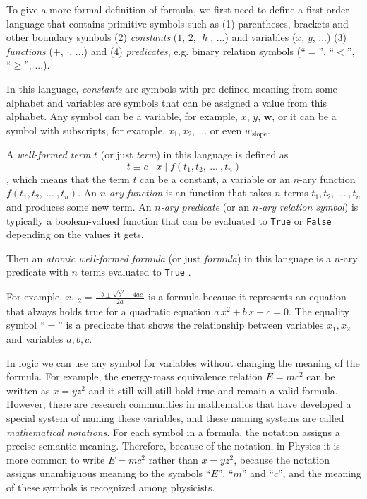 To give a more formal definition of formula, we first need to define 
a first-order language that contains primitive symbols such as
(1) parentheses, brackets and other boundary symbols 
(2) \emph{constants} ($1$, $2$, $\hslash$, ...) and variables ($x$, $y$, ...)
(3) \emph{functions} ($+$, $\cdot$, ...) and
(4) \emph{predicates}, e.g. binary relation symbols (``$=$'', ``$<$'', ``$\geqslant$'', ...). 

In this language, \emph{constants} are symbols with pre-defined meaning 
from some alphabet and variables are symbols that can be assigned 
a value from this alphabet.
Any symbol can be a variable, for example, $x$, $y$, $\mathbf w$, or it can 
be a symbol with subscripts, for example, $x_1, x_2, \ ...$ or even $w_\text{slope}$.

A \emph{well-formed term} $t$ (or just \emph{term}) in this language is defined as 
$$t \equiv c \mid x \mid f(t_1, t_2, \ ... \ , t_n)$$, which means that the term
$t$ can be a constant, a variable or an $n$-ary function 
$f(t_1, t_2, \ ... \ , t_n)$. An  \emph{$n$-ary function} is an 
function that takes $n$ terms $t_1, t_2, \ ... \ , t_n$ and produces 
some new term. An \emph{$n$-ary predicate} (or an \emph{$n$-ary relation symbol})
is typically a boolean-valued function that can be evaluated to \texttt{True} 
or \texttt{False} depending on the values it gets. 

Then an \emph{atomic well-formed formula} (or just \emph{formula}) in this language 
is a $n$-ary predicate with $n$ terms evaluated to \texttt{True} \cite{barwise2000language}. 

For example, $x_{1,2} = \frac{-b \pm \sqrt{b^2 - 4 a c}}{2 a}$ is a formula 
because it represents an equation that always holds true for a quadratic equation
$a\, x^2 + b\, x + c = 0$. The equality symbol ``$=$'' is a predicate that shows 
the relationship between variables $x_1, x_2$ and variables $a, b, c$. 

In logic we can use any symbol for variables without changing the meaning of the formula. 
For example, the energy-mass equivalence relation $E = mc^2$ can be written 
as $x = y z^2$ and it still will still hold true and remain a valid formula. 
However, there are research communities in mathematics that have developed
a special system of naming these variables, and these naming systems are 
called \emph{mathematical notations}. For each symbol in a formula, 
the notation assigns a precise semantic meaning. Therefore, because of the 
notation, in Physics it is more common to write $E = mc^2$ rather 
than $x = y z^2$, because the notation assigns unambiguous meaning to the symbols
``$E$'', ``$m$'' and ``$c$'', and the meaning of these symbols is recognized 
among physicists. 

